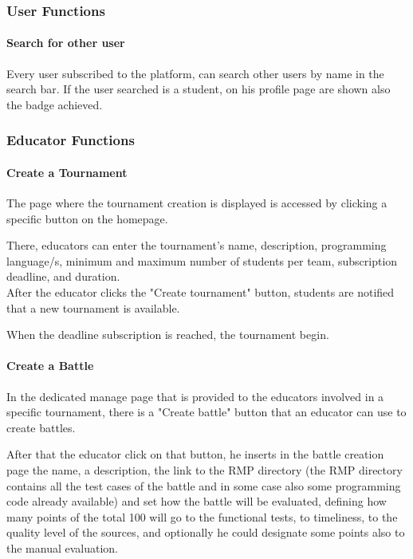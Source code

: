 \subsubsection{User Functions}

\paragraph{Search for other user}
Every user subscribed to the platform, can search other users by name in the search bar. If the user searched is a student, on his profile page are shown also the badge achieved.

\subsubsection{Educator Functions}

\paragraph{Create a Tournament}
The page where the tournament creation is displayed is accessed by clicking a specific button on the homepage. 

There, educators can enter the tournament's name, description, programming language/s, minimum and maximum number of students per team, subscription deadline, and duration.\\ 
After the educator clicks the "Create tournament" button, students are notified that a new tournament is available.

When the deadline subscription is reached, the tournament begin.

\paragraph{Create a Battle}
In the dedicated manage page that is provided to the educators involved in a specific tournament, there is a "Create battle" button that an educator can use to create battles.

After that the educator click on that button, he inserts in the battle creation page the name, a description, the link to the RMP directory (the RMP directory contains all the test cases of the battle
and in some case also some programming code already available) and set how the battle will be evaluated, defining how many points of the total 100 will go to the functional tests, to timeliness, to 
the quality level of the sources, and optionally he could designate some points also to the manual evaluation. 

